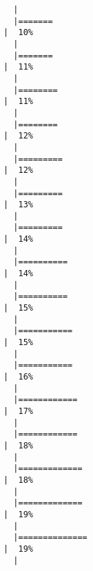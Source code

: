 \documentclass[
  letterpaper,
]{book}
\begin{document}
\begin{verbatim}
  |                                                                            
  |=======                                                               |  10%
  |                                                                            
  |=======                                                               |  11%
  |                                                                            
  |========                                                              |  11%
  |                                                                            
  |========                                                              |  12%
  |                                                                            
  |=========                                                             |  12%
  |                                                                            
  |=========                                                             |  13%
  |                                                                            
  |=========                                                             |  14%
  |                                                                            
  |==========                                                            |  14%
  |                                                                            
  |==========                                                            |  15%
  |                                                                            
  |===========                                                           |  15%
  |                                                                            
  |===========                                                           |  16%
  |                                                                            
  |============                                                          |  17%
  |                                                                            
  |============                                                          |  18%
  |                                                                            
  |=============                                                         |  18%
  |                                                                            
  |=============                                                         |  19%
  |                                                                            
  |==============                                                        |  19%
  |                                                                            

\end{verbatim}
\end{document}
